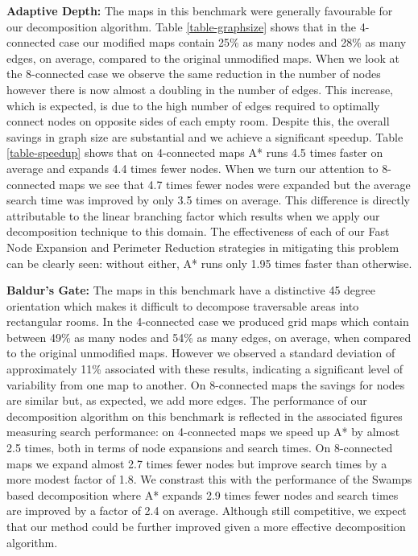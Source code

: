 \textbf{Adaptive Depth:}
The maps in this benchmark were generally favourable for our decomposition algorithm. 
Table \ref{table-graphsize} shows that in the 4-connected case our modified maps contain 
25\% as many nodes and 28\% as many edges, on average, compared to the original unmodified maps.
When we look at the 8-connected case we observe the same reduction in the number of nodes however there is now almost a
doubling in the number of edges.
This increase, which is expected, is due to the high number of edges required to optimally connect nodes on opposite sides of 
each empty room. 
Despite this, the overall savings in graph size are substantial and we achieve a significant speedup.
Table \ref{table-speedup} shows that on 4-connected maps A* runs 4.5 times faster on average and expands 4.4 times fewer nodes.
When we turn our attention to 8-connected maps we see that 4.7 times fewer nodes were expanded but the average
search time was improved by only 3.5 times on average.
This difference is directly attributable to the linear branching factor which results when we apply our decomposition
technique to this domain. 
The effectiveness of each of our Fast Node Expansion and Perimeter Reduction strategies in mitigating this problem can
be clearly seen: without either, A* runs only 1.95 times faster than otherwise. 
\par
\textbf{Baldur's Gate:}
The maps in this benchmark have a distinctive 45 degree orientation which makes it difficult to decompose traversable
areas into rectangular rooms. 
In the 4-connected case we produced grid maps which contain between 49\% as many nodes and 54\% as many
edges, on average, when compared to the original unmodified maps.
However we observed a standard deviation of approximately 11\% associated with these results, indicating a significant level of
variability from one map to another.
On 8-connected maps the savings for nodes are similar but, as expected, we add more edges.
The performance of our decomposition algorithm on this benchmark is reflected in the associated figures measuring search performance:
on 4-connected maps we speed up A* by almost 2.5 times, both in terms of node expansions and search times.
On 8-connected maps we expand almost 2.7 times fewer nodes but improve search times by a more modest factor of 1.8.
We constrast this with the performance of the Swamps based decomposition where A* expands 
2.9 times fewer nodes and search times are improved by a factor of 2.4 on
average.
Although still competitive, we expect that our method could be further improved
given a more effective decomposition algorithm.

